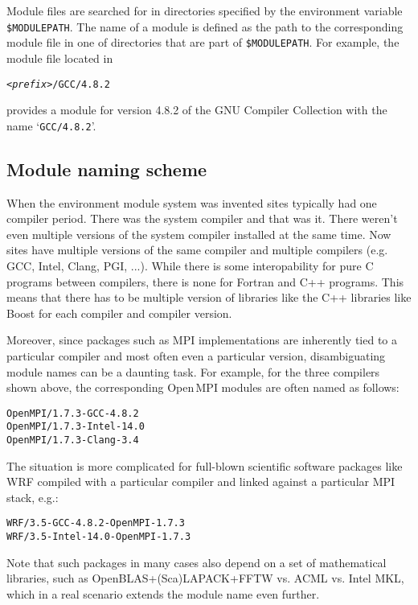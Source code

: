 Module files are searched for in directories specified by the
environment variable \texttt{\$MODULEPATH}. The name of a module is defined
as the path to the corresponding module file in one of directories that are
part of \texttt{\$MODULEPATH}. For example, the module file located in
{\small
\begin{alltt}
    <\emph{prefix}>/GCC/4.8.2
\end{alltt}
}
provides a module for version 4.8.2 of the GNU Compiler Collection with the
name `\texttt{GCC/4.8.2}'.

\subsection{Module naming scheme}
\label{sec:Module_naming_scheme}
When the environment module system was invented sites typically had
one compiler period.  There was the system compiler and that was it.
There weren't even multiple versions of the system compiler installed
at the same time.  Now sites have multiple versions of the same
compiler and multiple compilers (e.g. GCC, Intel, Clang, PGI, ...).
While there is some interopability for pure C programs between
compilers, there is none for Fortran and C++ programs.  This means
that there has to be multiple version of libraries like the C++
libraries like Boost for each compiler and compiler version.

Moreover, since packages such as MPI implementations are inherently tied to a
particular compiler and most often even a particular version, disambiguating
module names can be a daunting task. For example, for the three compilers
shown above, the corresponding Open\,MPI modules are often named as follows:
{\small
\begin{alltt}
    OpenMPI/1.7.3-GCC-4.8.2
    OpenMPI/1.7.3-Intel-14.0
    OpenMPI/1.7.3-Clang-3.4
\end{alltt}
}

The situation is more complicated for full-blown scientific software
packages like WRF compiled with a particular compiler and linked
against a particular MPI stack, e.g.:
{\small
\begin{alltt}
    WRF/3.5-GCC-4.8.2-OpenMPI-1.7.3
    WRF/3.5-Intel-14.0-OpenMPI-1.7.3
\end{alltt}
}
\noindent
Note that such packages in many cases also depend on a set of mathematical
libraries, such as OpenBLAS+(Sca)LAPACK+FFTW vs. ACML vs. Intel MKL, which in a
real scenario extends the module name even further.


